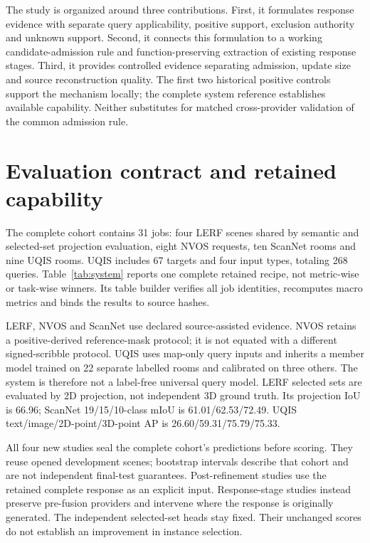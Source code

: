 \documentclass[10pt]{article}
\begin{document}
The study is organized around three contributions. First, it formulates
response evidence with separate query applicability, positive support,
exclusion authority and unknown support. Second, it connects this formulation
to a working candidate-admission rule and function-preserving extraction of
existing response stages. Third, it provides controlled evidence separating
admission, update size and source reconstruction quality. The first two
historical positive controls support the mechanism locally; the complete
system reference establishes available capability. Neither substitutes for
matched cross-provider validation of the common admission rule.



\section{Evaluation contract and retained capability}
The complete cohort contains 31 jobs: four LERF scenes shared by semantic and
selected-set projection evaluation, eight NVOS requests, ten ScanNet rooms and
nine UQIS rooms. UQIS includes 67 targets and four input types, totaling 268
queries. Table~\ref{tab:system} reports one complete retained recipe, not
metric-wise or task-wise winners. Its table builder verifies all job identities,
recomputes macro metrics and binds the results to source hashes.

\begin{table}[ht]
\centering\small
\resizebox{\linewidth}{!}{}
\caption{Complete retained v10 capability reference. These results belong to
its actual providers and readouts, not to an unvalidated common refinement rule.}
\label{tab:system}
\end{table}

LERF, NVOS and ScanNet use declared source-assisted evidence. NVOS retains a
positive-derived reference-mask protocol; it is not equated with a different
signed-scribble protocol. UQIS uses map-only query inputs and inherits a member
model trained on 22 separate labelled rooms and calibrated on three others.
The system is therefore not a label-free universal query model. LERF selected
sets are evaluated by 2D projection, not independent 3D ground truth. Its
projection IoU is 66.96; ScanNet 19/15/10-class mIoU is 61.01/62.53/72.49.
UQIS text/image/2D-point/3D-point AP is 26.60/59.31/75.79/75.33.

All four new studies seal the complete cohort's predictions before scoring.
They reuse opened development scenes; bootstrap intervals describe that cohort
and are not independent final-test guarantees. Post-refinement studies use
the retained complete response as an explicit input. Response-stage studies
instead preserve pre-fusion providers and intervene where the response is
originally generated. The independent selected-set heads stay fixed. Their
unchanged scores do not establish an improvement in instance selection.
\end{document}
